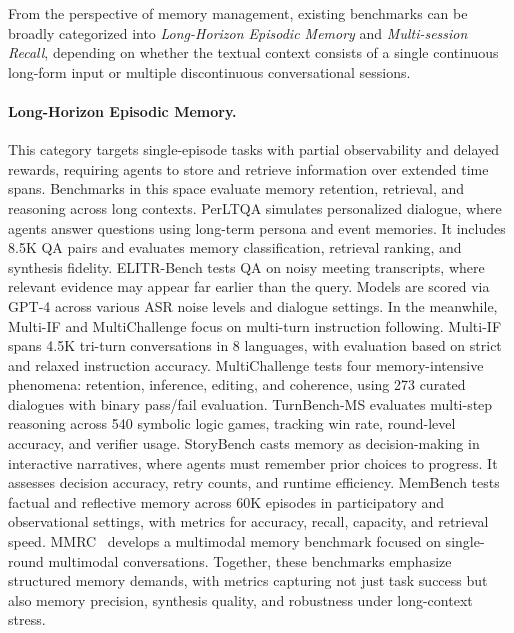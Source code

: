 From the perspective of memory management, existing benchmarks can be broadly categorized into \textit{Long-Horizon Episodic Memory} and \textit{Multi-session Recall}, depending on whether the textual context consists of a single continuous long-form input or multiple discontinuous conversational sessions.

\paragraph{Long-Horizon Episodic Memory.}
This category targets single-episode tasks with partial observability and delayed rewards, requiring agents to store and retrieve information over extended time spans. Benchmarks in this space evaluate memory retention, retrieval, and reasoning across long contexts. PerLTQA \cite{du2024perltqa} simulates personalized dialogue, where agents answer questions using long-term persona and event memories. It includes 8.5K QA pairs and evaluates memory classification, retrieval ranking, and synthesis fidelity. ELITR-Bench \cite{thonet2024elitr} tests QA on noisy meeting transcripts, where relevant evidence may appear far earlier than the query. Models are scored via GPT-4 across various ASR noise levels and dialogue settings. In the meanwhile, Multi-IF \cite{he2024multi} and MultiChallenge \cite{sirdeshmukh2025multichallenge} focus on multi-turn instruction following. Multi-IF \cite{he2024multi} spans 4.5K tri-turn conversations in 8 languages, with evaluation based on strict and relaxed instruction accuracy. MultiChallenge \cite{sirdeshmukh2025multichallenge} tests four memory-intensive phenomena: retention, inference, editing, and coherence, using 273 curated dialogues with binary pass/fail evaluation. TurnBench-MS \cite{zhang2025turnbench} evaluates multi-step reasoning across 540 symbolic logic games, tracking win rate, round-level accuracy, and verifier usage. StoryBench \cite{wan2025storybench} casts memory as decision-making in interactive narratives, where agents must remember prior choices to progress. It assesses decision accuracy, retry counts, and runtime efficiency. MemBench \cite{tan2025membench} tests factual and reflective memory across 60K episodes in participatory and observational settings, with metrics for accuracy, recall, capacity, and retrieval speed. MMRC~\cite{xue2025mmrc} develops a multimodal memory benchmark focused on single-round multimodal conversations. Together, these benchmarks emphasize structured memory demands, with metrics capturing not just task success but also memory precision, synthesis quality, and robustness under long-context stress.

